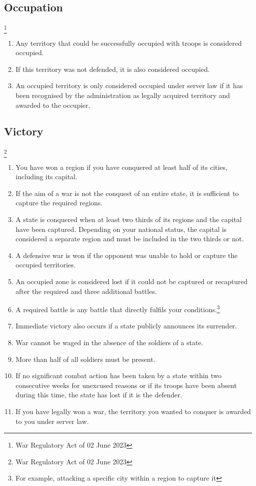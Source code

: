 \documentclass{article}
\begin{document}
\subsection{Occupation}\footnote{War Regulatory Act of 02 June 2023}
\begin{enumerate}[(1)]
	\item Any territory that could be successfully occupied with troops is considered occupied.
	\item If this territory was not defended, it is also considered occupied.
	\item An occupied territory is only considered occupied under server law if it has been recognised by the administration as legally acquired territory and awarded to the occupier.
\end{enumerate}

\subsection{Victory}\footnote{War Regulatory Act of 02 June 2023}
\begin{enumerate}[(1)]
	\item You have won a region if you have conquered at least half of its cities, including its capital.
	\item If the aim of a war is not the conquest of an entire state, it is sufficient to capture the required regions.
	\item A state is conquered when at least two thirds of its regions and the capital have been captured. Depending on your national status, the capital is considered a separate region and must be included in the two thirds or not.
	\item A defensive war is won if the opponent was unable to hold or capture the occupied territories.
	\item An occupied zone is considered lost if it could not be captured or recaptured after the required and three additional battles.
	\item A required battle is any battle that directly fulfils your conditions.\footnote{For example, attacking a specific city within a region to capture it}
	\item Immediate victory also occurs if a state publicly announces its surrender.
	\item War cannot be waged in the absence of the soldiers of a state.
	\item More than half of all soldiers must be present.
	\item If no significant combat action has been taken by a state within two consecutive weeks for unexcused reasons or if its troops have been absent during this time, the state has lost if it is the defender.
	\item If you have legally won a war, the territory you wanted to conquer is awarded to you under server law.
\end{enumerate}
\end{document}
